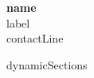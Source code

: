 \documentclass[10pt,letterpaper]{article}
\begin{document}
\begin{center}
        {\LARGE \textbf{ {{name}} }}\\
    {{label}}\\
    \vspace{4pt}
    {\small {{contactLine}}}
\end{center}

{{dynamicSections}}
\end{document}
